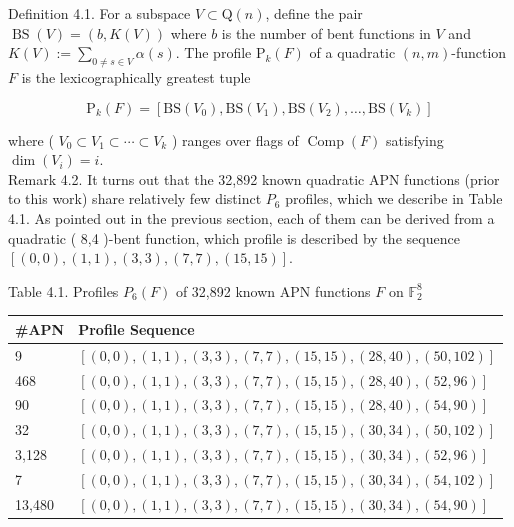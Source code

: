 \documentclass[10pt]{article}
\begin{document}
Definition 4.1. For a subspace $V \subset \mathrm{Q}(n)$, define the pair $\operatorname{BS}(V)=(b, K(V))$ where $b$ is the number of bent functions in $V$ and $K(V):=\sum_{0 \neq s \in V} \alpha(s)$. The profile $\mathrm{P}_{k}(F)$ of a quadratic $(n, m)$-function $F$ is the lexicographically greatest tuple


\begin{equation*}
\mathrm{P}_{k}(F)=\left[\mathrm{BS}\left(V_{0}\right), \mathrm{BS}\left(V_{1}\right), \mathrm{BS}\left(V_{2}\right), \ldots, \mathrm{BS}\left(V_{k}\right)\right] \tag{4.1}
\end{equation*}


where ( $V_{0} \subset V_{1} \subset \cdots \subset V_{k}$ ) ranges over flags of $\operatorname{Comp}(F)$ satisfying $\operatorname{dim}\left(V_{i}\right)=i$.\\
Remark 4.2. It turns out that the 32,892 known quadratic APN functions (prior to this work) share relatively few distinct $P_{6}$ profiles, which we describe in Table 4.1. As pointed out in the previous section, each of them can be derived from a quadratic ( 8,4 )-bent function, which profile is described by the sequence $[(0,0),(1,1),(3,3),(7,7),(15,15)]$.

Table 4.1. Profiles $P_{6}(F)$ of 32,892 known APN functions $F$ on $\mathbb{F}_{2}^{8}$

\begin{center}
\begin{tabular}{|l|l|}
\hline
\#APN & Profile Sequence \\
\hline
9 & $[(0,0),(1,1),(3,3),(7,7),(15,15),(28,40),(50,102)]$ \\
\hline
468 & $[(0,0),(1,1),(3,3),(7,7),(15,15),(28,40),(52,96)]$ \\
\hline
90 & $[(0,0),(1,1),(3,3),(7,7),(15,15),(28,40),(54,90)]$ \\
\hline
32 & $[(0,0),(1,1),(3,3),(7,7),(15,15),(30,34),(50,102)]$ \\
\hline
3,128 & $[(0,0),(1,1),(3,3),(7,7),(15,15),(30,34),(52,96)]$ \\
\hline
7 & $[(0,0),(1,1),(3,3),(7,7),(15,15),(30,34),(54,102)]$ \\
\hline
13,480 & $[(0,0),(1,1),(3,3),(7,7),(15,15),(30,34),(54,90)]$ \\
\hline
\end{tabular}
\end{center}
\end{document}
